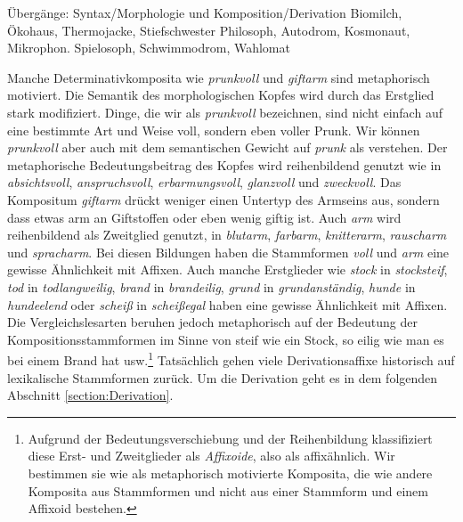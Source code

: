 \begin{Exkurs}{Übergänge: Syntax/Morphologie und Komposition/Derivation}
\ea \label{ea:Konfixkomposita}
\ea \label{ea:KonfixErstglied} Biomilch, Ökohaus, Thermojacke, Stiefschwester
\ex \label{ex:KonfixZweitglied1} Philosoph, Autodrom, Kosmonaut, Mikrophon.
\ex \label{ex:KonfixZweitglied2} Spielosoph, Schwimmodrom, Wahlomat
\z 
\z 


Manche Determinativkomposita wie \textit{prunkvoll} und \textit{giftarm} sind metaphorisch motiviert. Die Semantik des morphologischen Kopfes wird durch das Erstglied stark modifiziert. Dinge, die wir als \textit{prunkvoll} bezeichnen, sind nicht einfach auf eine bestimmte Art und Weise voll, sondern eben voller Prunk. Wir können \textit{prunkvoll} aber auch mit dem semantischen Gewicht auf \textit{prunk} als  verstehen. Der metaphorische Bedeutungsbeitrag des Kopfes wird reihenbildend genutzt wie \zB in \textit{absichtsvoll}, \textit{anspruchsvoll}, \textit{erbarmungsvoll}, \textit{glanzvoll} und \textit{zweckvoll}. Das Kompositum \textit{giftarm} drückt weniger einen Untertyp des Armseins aus, sondern dass etwas arm an Giftstoffen oder eben wenig giftig ist. Auch \textit{arm} wird reihenbildend als Zweitglied genutzt, \zB in \textit{blutarm}, \textit{farbarm}, \textit{knitterarm}, \textit{rauscharm} und \textit{spracharm}. Bei diesen Bildungen haben die  Stammformen \textit{voll} und \textit{arm} eine gewisse Ähnlichkeit mit Affixen. Auch manche Erstglieder wie \textit{stock} in \textit{stocksteif}, \textit{tod} in \textit{todlangweilig}, \textit{brand} in \textit{brandeilig}, \textit{grund} in \textit{grundanständig}, \textit{hunde} in \textit{hundeelend} oder \textit{scheiß} in \textit{scheißegal} haben eine gewisse Ähnlichkeit mit Affixen. Die Vergleichslesarten beruhen jedoch metaphorisch auf der Bedeutung der Kompositionsstammformen im Sinne von steif wie ein Stock, so eilig wie man es bei einem Brand hat usw.\footnote{Aufgrund der Bedeutungsverschiebung und der Reihenbildung klassifiziert \citet[10--11]{Motsch2004} diese Erst- und Zweitglieder als \textit{Affixoide}, also als affixähnlich. Wir bestimmen sie wie \citet[310]{FleischerBarz2012} als metaphorisch motivierte Komposita, die wie andere Komposita aus Stammformen und nicht aus einer Stammform und einem Affixoid bestehen.} Tatsächlich gehen viele Derivationsaffixe historisch auf lexikalische Stammformen zurück. Um die Derivation geht es in dem folgenden Abschnitt \ref{section:Derivation}.
\end{Exkurs}


